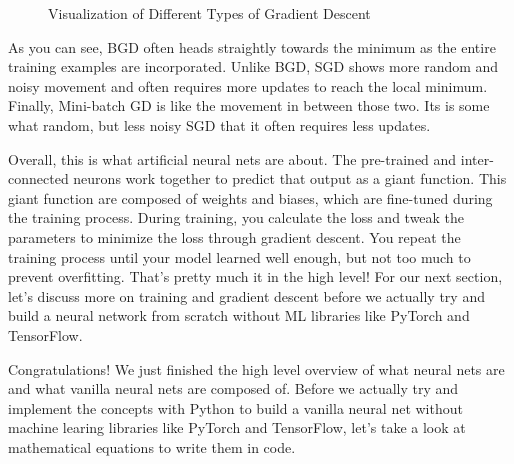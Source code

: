 \documentclass[../../../main.tex]{subfiles}
\begin{document}
\begin{figure}[H]
\caption{Visualization of Different Types of Gradient Descent}
\end{figure}

As you can see, BGD often heads straightly towards the minimum
as the entire training examples are incorporated. Unlike BGD,
SGD shows more random and noisy movement and often requires more
updates to reach the local minimum. Finally, Mini-batch GD is
like the movement in between those two. Its is some what random,
but less noisy SGD that it often requires less updates.

Overall, this is what artificial neural nets are about.
The pre-trained and inter-connected neurons work together to
predict that output as a giant function. This giant function are
composed of weights and biases, which are fine-tuned during the
training process. During training, you calculate the loss and
tweak the parameters to minimize the loss through gradient descent.
You repeat the training process until your model learned well enough,
but not too much to prevent overfitting. That's pretty much it in
the high level! For our next section, let's discuss more on training
and gradient descent before we actually try and build a neural
network from scratch without ML libraries like PyTorch and TensorFlow.

Congratulations! We just finished the high level overview of what
neural nets are and what vanilla neural nets are composed of.
Before we actually try and implement the concepts with Python to
build a vanilla neural net without machine learing libraries like
PyTorch and TensorFlow, let's take a look at mathematical equations
to write them in code.
\end{document}
